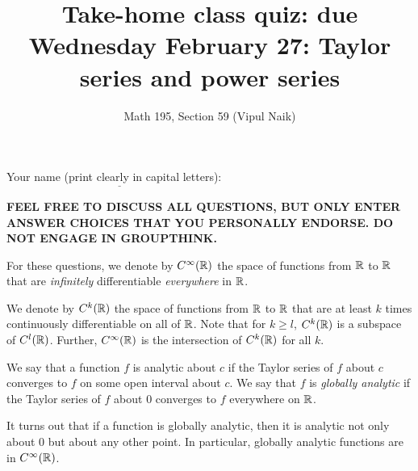 \documentclass[10pt]{amsart}
\title{Take-home class quiz: due Wednesday February 27: Taylor series and power series}
\author{Math 195, Section 59 (Vipul Naik)}
\begin{document}
\maketitle

Your name (print clearly in capital letters): $\underline{\qquad\qquad\qquad\qquad\qquad\qquad\qquad\qquad\qquad\qquad}$

{\bf FEEL FREE TO DISCUSS ALL QUESTIONS, BUT ONLY ENTER ANSWER CHOICES
THAT YOU PERSONALLY ENDORSE. DO NOT ENGAGE IN GROUPTHINK.}

For these questions, we denote by $C^\infty(\mathbb{R})$ the space of
functions from $\mathbb{R}$ to $\mathbb{R}$ that are {\em infinitely} differentiable
{\em everywhere} in $\mathbb{R}$.

We denote by $C^k(\mathbb{R})$ the space of functions from $\mathbb{R}$ to $\mathbb{R}$ that
are at least $k$ times continuously differentiable on all of
$\mathbb{R}$. Note that for $k \ge l$, $C^k(\mathbb{R})$ is a subspace of
$C^l(\mathbb{R})$. Further, $C^\infty(\mathbb{R})$ is the intersection of $C^k(\mathbb{R})$
for all $k$.

We say that a function $f$ is analytic about $c$ if the Taylor series
of $f$ about $c$ converges to $f$ on some open interval about $c$. We
say that $f$ is {\em globally analytic} if the Taylor series of $f$
about $0$ converges to $f$ everywhere on $\mathbb{R}$.

It turns out that if a function is globally analytic, then it is
analytic not only about $0$ but about any other point. In particular,
globally analytic functions are in $C^\infty(\mathbb{R})$.
\end{document}
